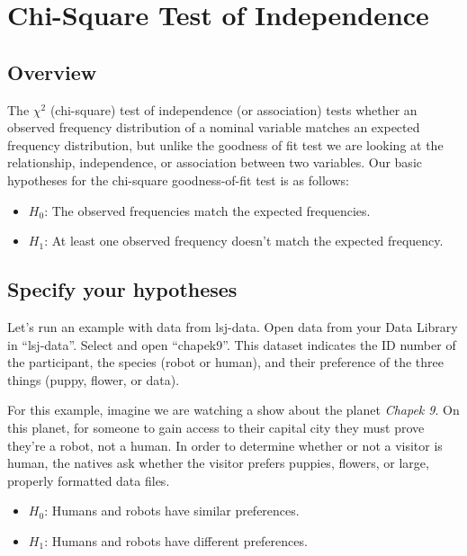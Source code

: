 \documentclass[
]{book}
\begin{document}
\hypertarget{chi-square-test-of-independence}{%
\section{Chi-Square Test of Independence}\label{chi-square-test-of-independence}}

\hypertarget{overview-4}{%
\subsection{Overview}\label{overview-4}}

The \(\chi^2\) (chi-square) test of independence (or association) tests whether an observed frequency distribution of a nominal variable matches an expected frequency distribution, but unlike the goodness of fit test we are looking at the relationship, independence, or association between two variables. Our basic hypotheses for the chi-square goodness-of-fit test is as follows:

\begin{itemize}
\item
  \(H_0\): The observed frequencies match the expected frequencies.
\item
  \(H_1\): At least one observed frequency doesn't match the expected frequency.
\end{itemize}

\hypertarget{specify-your-hypotheses-2}{%
\subsection{Specify your hypotheses}\label{specify-your-hypotheses-2}}

Let's run an example with data from lsj-data. Open data from your Data Library in ``lsj-data''. Select and open ``chapek9''. This dataset indicates the ID number of the participant, the species (robot or human), and their preference of the three things (puppy, flower, or data).

For this example, imagine we are watching a show about the planet \emph{Chapek 9}. On this planet, for someone to gain access to their capital city they must prove they're a robot, not a human. In order to determine whether or not a visitor is human, the natives ask whether the visitor prefers puppies, flowers, or large, properly formatted data files.

\begin{itemize}
\item
  \(H_0\): Humans and robots have similar preferences.
\item
  \(H_1\): Humans and robots have different preferences.
\end{itemize}
\end{document}
